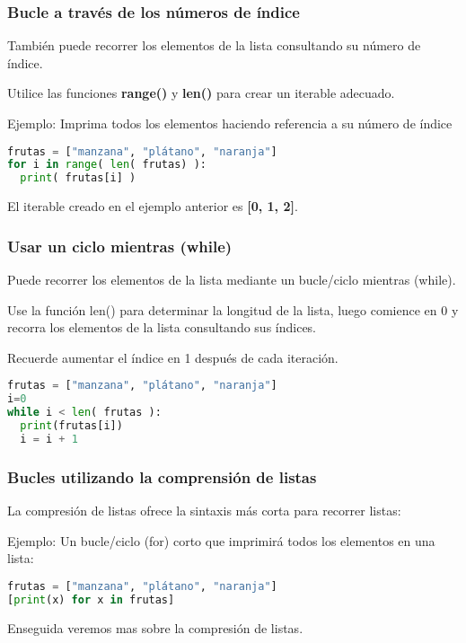\begin{frame}[fragile]
  \frametitle{Bucle a través de los números de índice}

  También puede recorrer los elementos de la lista
  consultando su número de índice.

  Utilice las funciones \textbf{range()} y \textbf{len()}
  para crear un iterable adecuado.

  \vspace{\baselineskip}
  Ejemplo: Imprima todos los elementos haciendo referencia
  a su número de índice
  \begin{lstlisting}[language=Python]
frutas = ["manzana", "plátano", "naranja"]
for i in range( len( frutas) ):
  print( frutas[i] )
  \end{lstlisting}

  \vspace{\baselineskip}
  El iterable creado en el ejemplo anterior es \textbf{[0, 1, 2]}.
\end{frame}

\begin{frame}[fragile]
  \frametitle{Usar un ciclo mientras (while)}

  Puede recorrer los elementos de la lista mediante un bucle/ciclo mientras
  (while).

  \vspace{\baselineskip}
  Use la función len() para determinar la longitud de la lista,
  luego comience en 0 y recorra los elementos de la lista consultando
  sus índices.

  \vspace{\baselineskip}
  Recuerde aumentar el índice en 1 después de cada iteración.

  \vspace{\baselineskip}
  \begin{lstlisting}[language=Python]
frutas = ["manzana", "plátano", "naranja"]
i=0
while i < len( frutas ):
  print(frutas[i])
  i = i + 1
  \end{lstlisting}
\end{frame}

\begin{frame}[fragile]
  \frametitle{Bucles utilizando la comprensión de listas}

  La compresión de listas ofrece la sintaxis más corta para
  recorrer listas:

  \vspace{\baselineskip}
  Ejemplo: Un bucle/ciclo (for) corto que imprimirá todos los
  elementos en una lista:
  \begin{lstlisting}[language=Python]
frutas = ["manzana", "plátano", "naranja"]
[print(x) for x in frutas]
  \end{lstlisting}

  \vspace{\baselineskip}
  Enseguida veremos mas sobre la compresión de listas.
\end{frame}



